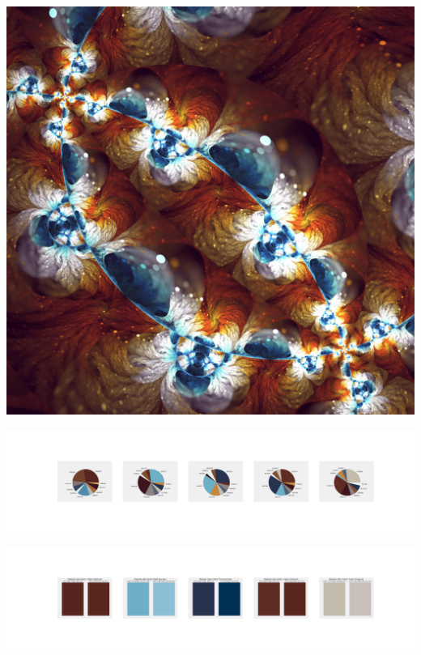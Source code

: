 \documentclass[11pt]{article}
\begin{document}
\begin{landscape}
    \begin{center}
    \includegraphics[width=\textwidth]{./nbimg/file (399).jpg}
    \end{center}

    \begin{center}
    \includegraphics[width=250mm]{./nbimg/pie-332.jpg}
    \end{center}

    \begin{center}
    \includegraphics[width=250mm]{./nbimg/peak-332.jpg}
    \end{center}
    


\end{landscape}
\end{document}
